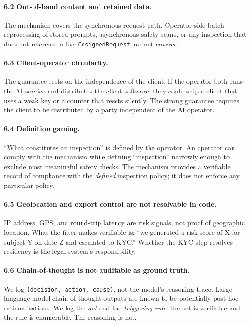 \documentclass[11pt,a4paper]{article}
\newcommand{\code}[1]{\texttt{#1}}
\newcommand{\term}[1]{\emph{#1}}
\begin{document}
\paragraph{6.2 Out-of-band content and retained data.}
The mechanism covers the synchronous request path. Operator-side batch reprocessing of
stored prompts, asynchronous safety scans, or any inspection that does not reference a
live \code{CosignedRequest} are not covered.

\paragraph{6.3 Client-operator circularity.}
The guarantee rests on the independence of the client. If the operator both runs the AI
service and distributes the client software, they could ship a client that uses a weak
key or a counter that resets silently. The strong guarantee requires the client to be
distributed by a party independent of the AI operator.

\paragraph{6.4 Definition gaming.}
``What constitutes an inspection'' is defined by the operator. An operator can comply
with the mechanism while defining ``inspection'' narrowly enough to exclude most
meaningful safety checks. The mechanism provides a verifiable record of compliance with
the \term{defined} inspection policy; it does not enforce any particular policy.

\paragraph{6.5 Geolocation and export control are not resolvable in code.}
IP address, GPS, and round-trip latency are risk signals, not proof of geographic
location. What the filter makes verifiable is: ``we generated a risk score of X for
subject Y on date Z and escalated to KYC.'' Whether the KYC step resolves residency is
the legal system's responsibility.

\paragraph{6.6 Chain-of-thought is not auditable as ground truth.}
We log \code{(decision, action, cause)}, not the model's reasoning trace. Large language
model chain-of-thought outputs are known to be potentially post-hoc rationalisations. We
log the \term{act} and the \term{triggering rule}; the act is verifiable and the rule is
enumerable. The reasoning is not.
\end{document}
